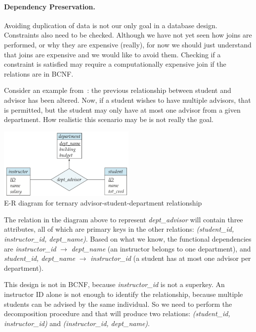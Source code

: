 \paragraph{Dependency Preservation.} Avoiding duplication of data is not our only goal in a database design. Constraints also need to be checked. Although we have not yet seen how joins are performed, or why they are expensive (really), for now we should just understand that joins are expensive and we would like to avoid them. Checking if a constraint is satisfied may require a computationally expensive join if the relations are in BCNF.

Consider an example from~\cite{dsc}: the previous relationship between student and advisor has been altered. Now, if a student wishes to have multiple advisors, that is permitted, but the student may only have at most one advisor from a given department. How realistic this scenario may be is not really the goal.

\begin{center}
\includegraphics[width=0.5\textwidth]{images/advise-3}\\
E-R diagram for ternary advisor-student-department relationship~\cite{dsc}
\end{center}

The relation in the diagram above to represent \textit{dept\_advisor} will contain three attributes, all of which are primary keys in the other relations: \textit{(student\_id, instructor\_id, dept\_name)}. Based on what we know, the functional dependencies are \textit{instructor\_id} $\rightarrow$ \textit{dept\_name} (an instructor belongs to one department), and \textit{student\_id, dept\_name} $\rightarrow$ \textit{instructor\_id} (a student has at most one advisor per department). 

This design is not in BCNF, because \textit{instructor\_id} is not a superkey. An instructor ID alone is not enough to identify the relationship, because multiple students can be advised by the same individual. So we need to perform the decomposition procedure and that will produce two relations: \textit{(student\_id, instructor\_id)} and \textit{(instructor\_id, dept\_name)}.

